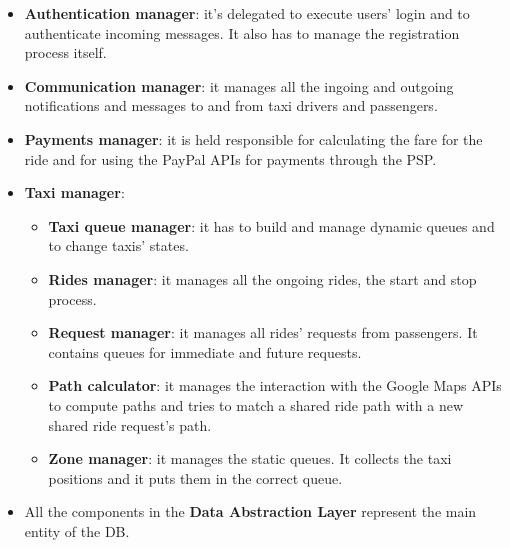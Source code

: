 \begin{itemize}

\item \label{itm:auth-mgr}\textbf{Authentication manager}: it's delegated to execute users' login and to authenticate incoming messages. It also has to manage the registration process itself.

\item \label{itm:comm-mgr}\textbf{Communication manager}: it manages all the ingoing and outgoing notifications and messages to and from taxi drivers and passengers.

\item \label{itm:pmnt-mgr}\textbf{Payments manager}: it is held responsible for calculating the fare for the ride and for using the PayPal APIs for payments through the PSP.

\item \textbf{Taxi manager}:
\begin{itemize}

\item \label{itm:taxiq-mgr} \textbf{Taxi queue manager}: it has to build and manage dynamic queues and to change taxis' states.

\item \label{itm:rides-mgr} \textbf{Rides manager}: it manages all the ongoing rides, the start and stop process.

\item \label{itm:reqs-mgr}\textbf{Request manager}: it manages all rides' requests from passengers. It contains queues for immediate and future requests.

\item \label{itm:path-calc} \textbf{Path calculator}: it manages the interaction with the Google Maps APIs to compute paths and tries to match a shared ride path with a new shared ride request's path.

\item \label{itm:zone-mgr} \textbf{Zone manager}: it manages the static queues. It collects the taxi positions and it puts them in the correct queue.
\end{itemize}

\item All the components in the \textbf{Data Abstraction Layer} represent the main entity of the DB.

\end{itemize}

